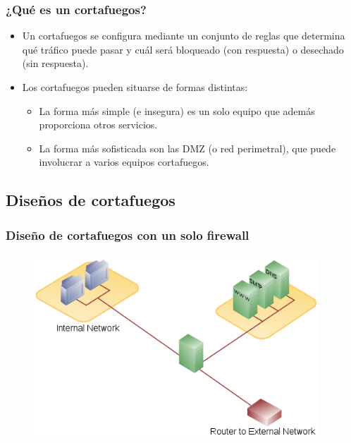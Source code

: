 \documentclass{beamer}
\begin{document}

\begin{frame}
\frametitle{¿Qué es un cortafuegos?}

\begin{itemize}
\item Un cortafuegos se configura mediante un conjunto de reglas que determina qué tráfico puede pasar y cuál será bloqueado (con respuesta) o desechado (sin respuesta).
\item Los cortafuegos pueden situarse de formas distintas: 
	\begin{itemize}
	\item La forma más simple (e insegura) es un solo equipo que además proporciona otros servicios.
	\item La forma más sofisticada son las DMZ (o red perimetral), que puede involucrar a varios equipos cortafuegos. 
	\end{itemize}
\end{itemize}

\end{frame}

\subsection{Diseños de cortafuegos}

\begin{frame}
\frametitle{Diseño de cortafuegos con un solo firewall}

\begin{figure}[h]

\begin{center}
  \centering
  \includegraphics[height=2.7in]{figs/500px-DMZ_network_diagram_1_firewall.png}
\end{center}
\end{figure}

\end{frame}
\end{document}

